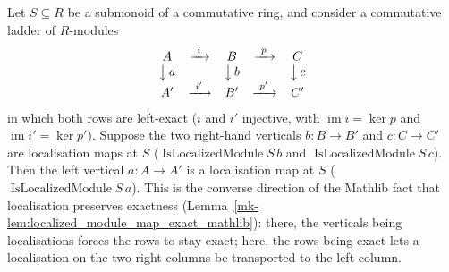 \begin{lemma}\label{mk-lem:isLocalizedModule_of_exact}
  \leanok

  Let \(S \subseteq R\) be a submonoid of a commutative ring, and consider a commutative ladder of
  \(R\)-modules
  \[
    \begin{array}{ccccc}
      A & \xrightarrow{\ i\ } & B & \xrightarrow{\ p\ } & C \\
      \big\downarrow{\,a} & & \big\downarrow{\,b} & & \big\downarrow{\,c} \\
      A' & \xrightarrow{\ i'\ } & B' & \xrightarrow{\ p'\ } & C'
    \end{array}
  \]
  in which both rows are left-exact (\(i\) and \(i'\) injective, with \(\operatorname{im} i = \ker p\) and
  \(\operatorname{im} i' = \ker p'\)). Suppose the two right-hand verticals \(b : B \to B'\) and
  \(c : C \to C'\) are localisation maps at \(S\) (\(\operatorname{IsLocalizedModule} S\, b\) and
  \(\operatorname{IsLocalizedModule} S\, c\)). Then the left vertical \(a : A \to A'\) is a localisation map
  at \(S\) (\(\operatorname{IsLocalizedModule} S\, a\)). This is the converse direction of the Mathlib fact
  that localisation preserves exactness (Lemma~\ref{mk-lem:localized_module_map_exact_mathlib}): there, the
  verticals being localisations forces the rows to stay exact; here, the rows being exact lets a
  localisation on the two right columns be transported to the left column.
\end{lemma}

